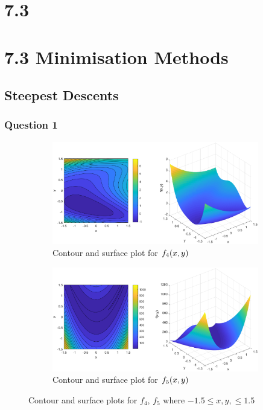 \documentclass[11pt]{article} %
\let\originalleft\left
\let\originalright\right
\renewcommand{\left}{\mathopen{}\mathclose\bgroup\originalleft}
\renewcommand{\right}{\aftergroup\egroup\originalright}
\begin{document}
\section*{7.3}
\vspace*{3cm}

\section*{7.3 Minimisation Methods}

\subsection*{Steepest Descents}

\subsubsection*{Question 1}
\begin{figure}[H]
	\centering
	\begin{subfigure}{1\textwidth}
		\centering
		\includegraphics[width=0.99\textwidth]{"../Matlab Files/contour1"}
		\caption{Contour and surface plot for $f_4\left(x, y\right)$}
	\end{subfigure}
	\begin{subfigure}{1\textwidth}
		\centering
		\includegraphics[width=0.99\textwidth]{"../Matlab Files/contour2"}
		\caption{Contour and surface plot for $f_5\left(x, y\right)$}
	\end{subfigure}
	\caption{Contour and surface plots for $f_4$, $f_5$ where $-1.5 \leq x, y, \leq 1.5$}
	\label{fig:surf_cont_plots}
\end{figure}
\end{document}
